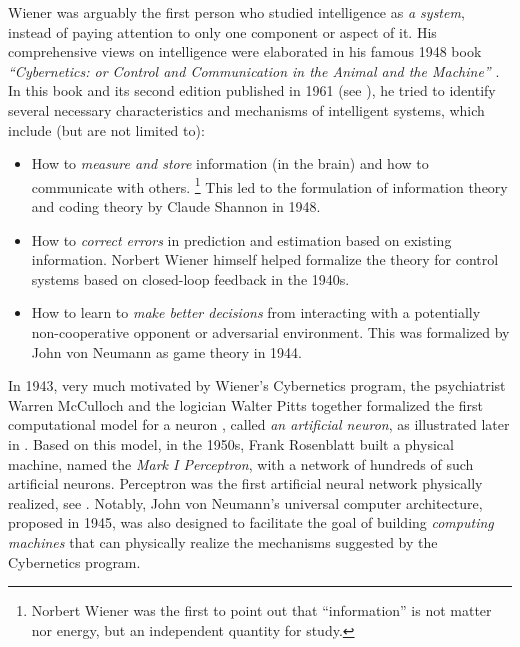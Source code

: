 \documentclass[../../book-main.tex]{subfiles}
\begin{document}
Wiener was arguably the first person who studied intelligence as {\em a system}, instead of paying attention to only one component or aspect of it. His comprehensive views on intelligence were elaborated in his famous 1948 book {\em ``Cybernetics: or Control and Communication in the Animal and the Machine''} \cite{Wiener-Cybernetics-1948}. In this book and its second edition published in 1961 \cite{Wiener-Cybernetics-1961} (see ), he tried to identify several necessary characteristics and mechanisms of intelligent systems, which include (but are not limited to):
\begin{itemize}
    \item How to {\em measure and store} information (in the brain) and how to communicate with others. \footnote{Norbert Wiener was the first to point out that ``information'' is not matter nor energy, but an independent quantity for study.} This led to the formulation of information theory and coding theory by Claude Shannon in 1948.
    \item How to {\em correct errors}  in prediction and estimation based on existing information. Norbert Wiener himself helped formalize the theory for control systems based on closed-loop feedback in the 1940s. 
    \item How to learn to {\em make better decisions} from interacting with a potentially non-cooperative opponent or adversarial environment. This was formalized by John von Neumann as game theory in 1944. 
\end{itemize}
In 1943, very much motivated by Wiener's Cybernetics program, the psychiatrist Warren McCulloch and the logician Walter Pitts together formalized the first computational model for a neuron \cite{McCulloch-Pitts}, called {\em an artificial neuron}, as illustrated later in . Based on this model, in the 1950s, Frank Rosenblatt built a physical machine, named the {\em Mark I Perceptron}, with a network of hundreds of such artificial neurons. Perceptron was the first artificial neural network physically realized, see . Notably, John von Neumann's universal computer architecture, proposed in 1945, was also designed to facilitate the goal of building {\em computing machines} that can physically realize the mechanisms suggested by the Cybernetics program. 
\end{document}
